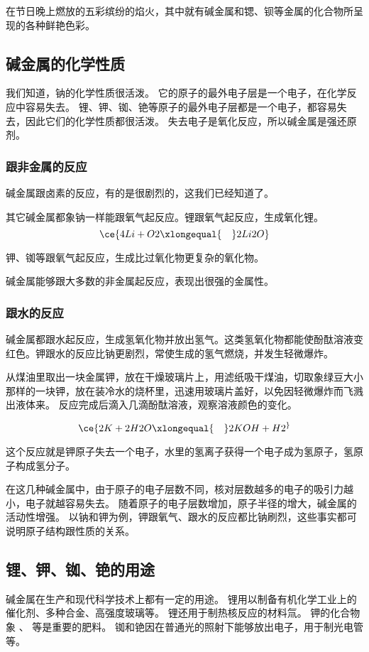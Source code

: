在节日晚上燃放的五彩缤纷的焰火，其中就有碱金属和锶、钡等金属的化合物所呈现的各种鲜艳色彩。

\subsection{碱金属的化学性质}
我们知道，钠的化学性质很活泼。
它的原子的最外电子层是一个电子，在化学反应中容易失去。
锂、钾、铷、铯等原子的最外电子层都是一个电子，都容易失去，因此它们的化学性质都很活泼。
失去电子是氧化反应，所以碱金属是强还原剂。

\subsubsection{跟非金属的反应}
碱金属跟卤素的反应，有的是很剧烈的，这我们已经知道了。

其它碱金属都象钠一样能跟氧气起反应。锂跟氧气起反应，生成氧化锂。
\[ \ce{ 4Li+ O2 \xlongequal{\quad} 2 Li2O} \]

钾、铷等跟氧气起反应，生成比过氧化物更复杂的氧化物。

碱金属能够跟大多数的非金属起反应，表现出很强的金属性。

\subsubsection{跟水的反应}
碱金属都跟水起反应，生成氢氧化物并放出氢气。这类氢氧化物都能使酚酞溶液变红色。钾跟水的反应比钠更剧烈，常使生成的氢气燃烧，并发生轻微爆炸。
\begin{Experiment}
从煤油里取出一块金属钾，放在干燥玻璃片上，用滤纸吸干煤油，切取象绿豆大小那样的一块钾，放在装冷水的烧杯里，迅速用玻璃片盖好，以免因轻微爆炸而飞溅出液体来。
反应完成后滴入几滴酚酞溶液，观察溶液颜色的变化。
\end{Experiment}

\[ \ce{2K + 2H2O \xlongequal{\quad} 2KOH +H2 ^} \]

这个反应就是钾原子失去一个电子，水里的氢离子获得一个电子成为氢原子，氢原子构成氢分子。

在这几种碱金属中，由于原子的电子层数不同，核对层数越多的电子的吸引力越小，电子就越容易失去。
随着原子的电子层数增加，原子半径的增大，碱金属的活动性增强。
以钠和钾为例，钾跟氧气、跟水的反应都比钠刷烈，这些事实都可说明原子结构跟性质的关系。

\subsection{锂、钾、铷、铯的用途}
碱金属在生产和现代科学技术上都有一定的用途。
锂用以制备有机化学工业上的催化剂、多种合金、高强度玻璃等。
锂还用于制热核反应的材料氚。
钾的化合物象 、 等是重要的肥料。
铷和铯因在普通光的照射下能够放出电子，用于制光电管等。

